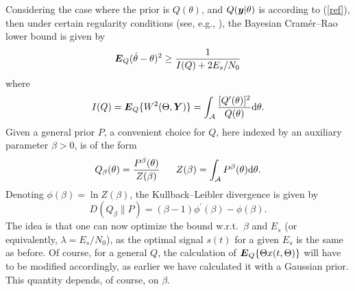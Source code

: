 \documentclass[11pt,epsf]{article}
\newcommand{\ct}{\hat{\theta}}
\newcommand {\by} {\mbox{\boldmath $y$}}
\newcommand {\bE} {\mbox{\boldmath $E$}}
\newcommand {\bY} {\mbox{\boldmath $Y$}}
\newcommand{\calA}{{\cal A}}
\begin{document}
Considering the case where the prior is $Q(\theta)$, and $Q(\by|\theta)$ is
according to (\ref{ref}), then under certain regularity conditions
(see, e.g., \cite{vantrees}), the Bayesian Cram\'er--Rao lower bound is given by
\begin{equation}
\bE_Q(\ct-\theta)^2\ge \frac{1}{I(Q)+2E_s/N_0}
\end{equation}
where
\begin{equation}
I(Q)=\bE_Q\{W^2(\Theta,\bY)\}=
\int_{\calA}\frac{[Q'(\theta)]^2}{Q(\theta)}\mbox{d}\theta .
\end{equation}
Given a general prior $P$, a convenient choice for $Q$, here indexed by
an auxiliary parameter $\beta > 0$, is of the form
\begin{equation}
Q_\beta(\theta)=\frac{P^\beta(\theta)}{Z(\beta)}~~~~~Z(\beta)=\int_{\calA}P^\beta(\theta)\mbox{d}\theta.
\end{equation}
Denoting $\phi(\beta)=\ln Z(\beta)$, the Kullback--Leibler divergence is
given by
\begin{equation}
D(Q_\beta\|P)=(\beta-1)\phi^\prime(\beta)-\phi(\beta).
\end{equation}
The idea is that one can now optimize the bound w.r.t.\ $\beta$ and $E_s$ (or
equivalently, $\lambda=E_s/N_0$), as the optimal signal $s(t)$ for a given $E_s$ is the same
as before. Of course, for a general $Q$, the calculation of $\bE_Q\{\Theta
x(t,\Theta)\}$ will have to be modified accordingly, as earlier we have calculated
it with a Gaussian prior. This quantity depends, of course, on $\beta$.
\end{document}
